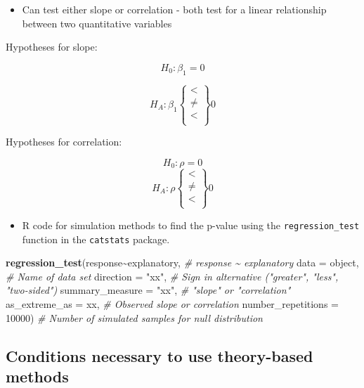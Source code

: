\documentclass[
]{report}
\newenvironment{Shaded}{\begin{snugshade}}{\end{snugshade}}
\newcommand{\AttributeTok}[1]{\textcolor[rgb]{0.13,0.29,0.53}{#1}}
\newcommand{\CommentTok}[1]{\textcolor[rgb]{0.56,0.35,0.01}{\textit{#1}}}
\newcommand{\DecValTok}[1]{\textcolor[rgb]{0.00,0.00,0.81}{#1}}
\newcommand{\FunctionTok}[1]{\textcolor[rgb]{0.13,0.29,0.53}{\textbf{#1}}}
\newcommand{\NormalTok}[1]{#1}
\newcommand{\SpecialCharTok}[1]{\textcolor[rgb]{0.81,0.36,0.00}{\textbf{#1}}}
\newcommand{\StringTok}[1]{\textcolor[rgb]{0.31,0.60,0.02}{#1}}
\providecommand{\tightlist}{%
  \setlength{\itemsep}{0pt}\setlength{\parskip}{0pt}}
\begin{document}
\begin{itemize}
\tightlist
\item
  Can test either slope or correlation - both test for a linear relationship between two quantitative variables
\end{itemize}

Hypotheses for slope:

\[H_0: \beta_1 = 0\]

\[H_A: \beta_1 \left\{
\begin{array}{ll}
< \\
\ne \\
< \\
\end{array}
\right\}
0\]

Hypotheses for correlation:

\[H_0: \rho = 0\]
\[H_A: \rho \left\{
\begin{array}{ll}
< \\
\ne \\
< \\
\end{array}
\right\}
0\]

\begin{itemize}
\tightlist
\item
  R code for simulation methods to find the p-value using the \texttt{regression\_test} function in the \texttt{catstats} package.
\end{itemize}

\begin{Shaded}
\begin{Highlighting}[]
\FunctionTok{regression\_test}\NormalTok{(response}\SpecialCharTok{\textasciitilde{}}\NormalTok{explanatory, }\CommentTok{\# response \textasciitilde{} explanatory}
               \AttributeTok{data =}\NormalTok{ object, }\CommentTok{\# Name of data set}
               \AttributeTok{direction =} \StringTok{"xx"}\NormalTok{, }\CommentTok{\# Sign in alternative ("greater", "less", "two{-}sided")}
               \AttributeTok{summary\_measure =} \StringTok{"xx"}\NormalTok{, }\CommentTok{\# "slope" or "correlation"}
               \AttributeTok{as\_extreme\_as =}\NormalTok{ xx, }\CommentTok{\# Observed slope or correlation}
               \AttributeTok{number\_repetitions =} \DecValTok{10000}\NormalTok{) }\CommentTok{\# Number of simulated samples for null distribution}
\end{Highlighting}
\end{Shaded}

\subsection*{Conditions necessary to use theory-based methods}\label{conditions-necessary-to-use-theory-based-methods}
\end{document}
